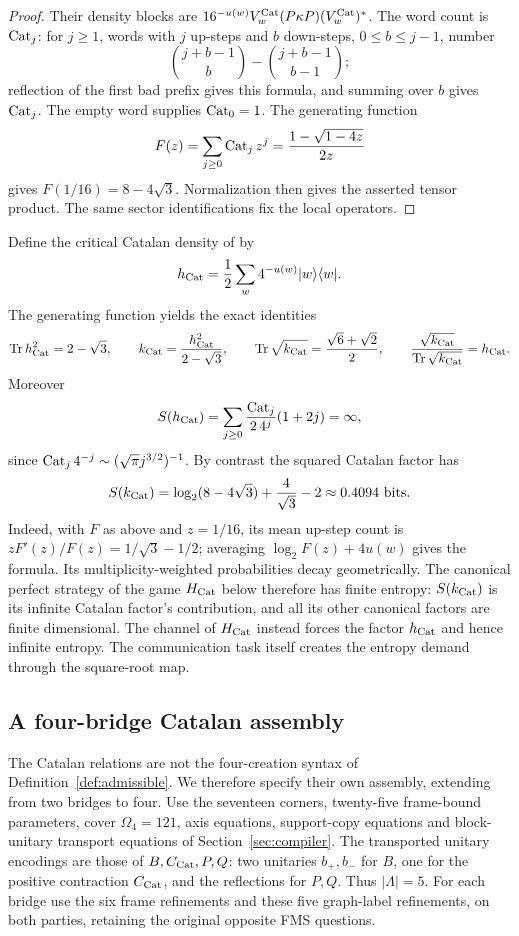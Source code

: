 \begin{proof}
Their density blocks are $16^{-u(w)}V_w^{\rm Cat}(P\kappa P)(V_w^{\rm Cat})^*$. The word count is $\operatorname{Cat}_j$: for $j\geq1$, words with $j$ up-steps and $b$ down-steps, $0\leq b\leq j-1$, number
\[
 \binom{j+b-1}{b}-\binom{j+b-1}{b-1};
\]
reflection of the first bad prefix gives this formula, and summing over $b$ gives $\operatorname{Cat}_j$. The empty word supplies $\operatorname{Cat}_0=1$. The generating function
\[
 F(z)=\sum_{j\geq0}\operatorname{Cat}_jz^j=\frac{1-\sqrt{1-4z}}{2z}
\]
gives $F(1/16)=8-4\sqrt3$. Normalization then gives the asserted tensor product. The same sector identifications fix the local operators.
\end{proof}

Define the critical Catalan density of \cite{Entropy} by
\[
 h_{\mathrm{Cat}}=\frac12\sum_w4^{-u(w)}|w\rangle\langle w|.
\]
The generating function yields the exact identities
\begin{equation}\label{eq:Catnumbers}
 \operatorname{Tr}h_{\mathrm{Cat}}^2=2-\sqrt3,\qquad
 k_{\mathrm{Cat}}=\frac{h_{\mathrm{Cat}}^2}{2-\sqrt3},\qquad
 \operatorname{Tr}\sqrt{k_{\mathrm{Cat}}}=\frac{\sqrt6+\sqrt2}{2},\qquad
 \frac{\sqrt{k_{\mathrm{Cat}}}}{\operatorname{Tr}\sqrt{k_{\mathrm{Cat}}}}=h_{\mathrm{Cat}}.
\end{equation}
Moreover
\begin{equation}\label{eq:Catentropy}
 S(h_{\mathrm{Cat}})=\sum_{j\geq0}\frac{\operatorname{Cat}_j}{2\,4^j}(1+2j)=\infty,
\end{equation}
since $\operatorname{Cat}_j4^{-j}\sim(\sqrt\pi j^{3/2})^{-1}$. By contrast the squared Catalan factor has
\[
 S(k_{\mathrm{Cat}})=\log_2(8-4\sqrt3)+\frac4{\sqrt3}-2
 \approx0.4094\ \text{bits}.
\]
Indeed, with $F$ as above and $z=1/16$, its mean up-step count is $zF'(z)/F(z)=1/\sqrt3-1/2$; averaging $\log_2 F(z)+4u(w)$ gives the formula. Its multiplicity-weighted probabilities decay geometrically. The canonical perfect strategy of the game $H_{\mathrm{Cat}}$ below therefore has finite entropy: $S(k_{\mathrm{Cat}})$ is its infinite Catalan factor's contribution, and all its other canonical factors are finite dimensional. The channel of $H_{\mathrm{Cat}}$ instead forces the factor $h_{\mathrm{Cat}}$ and hence infinite entropy. The communication task itself creates the entropy demand through the square-root map.

\subsection{A four-bridge Catalan assembly}
The Catalan relations are not the four-creation syntax of Definition~\ref{def:admissible}. We therefore specify their own assembly, extending \cite[Section~6]{Entropy} from two bridges to four. Use the seventeen corners, twenty-five frame-bound parameters, cover $\Omega_4=121$, axis equations, support-copy equations and block-unitary transport equations of Section~\ref{sec:compiler}. The transported unitary encodings are those of $B,C_{\mathrm{Cat}},P,Q$: two unitaries $b_+,b_-$ for $B$, one for the positive contraction $C_{\mathrm{Cat}}$, and the reflections for $P,Q$. Thus $|\Lambda|=5$. For each bridge use the six frame refinements and these five graph-label refinements, on both parties, retaining the original opposite FMS questions.

